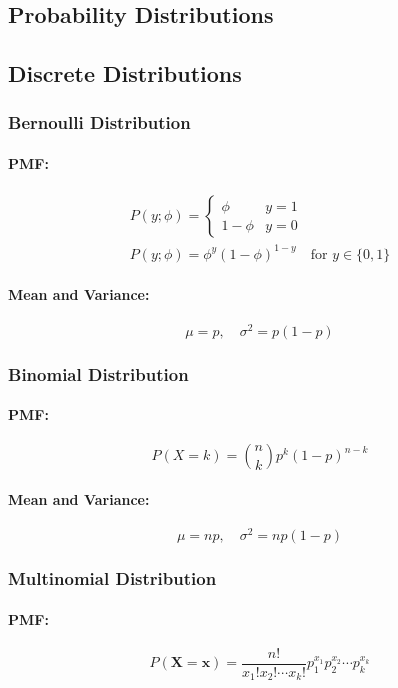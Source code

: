 \documentclass[8pt, a4paper, landscape, includeheadfoot]{extarticle}
\begin{document}
\begin{multicols*}{4}
	\section{Probability Distributions}

	\subsection{Discrete Distributions}

	\subsubsection{Bernoulli Distribution}{}
	\paragraph{PMF:}
	\begin{align*}
		P(y;\phi) = \begin{cases}
			\phi     & y = 1 \\
			1 - \phi & y = 0
		\end{cases} \\
		P(y;\phi) = \phi^y (1-\phi)^{1-y} \quad \text{for } y \in \{0,1\}
	\end{align*}

	\paragraph{Mean and Variance:}
	$$
		\mu = p, \quad \sigma^2 = p(1 - p)
	$$

	\subsubsection{Binomial Distribution}{}
	\paragraph{PMF:}
	$$
		P(X = k) = \binom{n}{k} p^k (1-p)^{n-k}
	$$
	\paragraph{Mean and Variance:}
	$$
		\mu = np, \quad \sigma^2 = np(1 - p)
	$$

	\subsubsection{Multinomial Distribution}{}
	\paragraph{PMF:}
	$$
		P(\mathbf{X} = \mathbf{x}) = \frac{n!}{x_1! x_2! \cdots x_k!} p_1^{x_1} p_2^{x_2} \cdots p_k^{x_k}
	$$

\end{multicols*}
\end{document}
